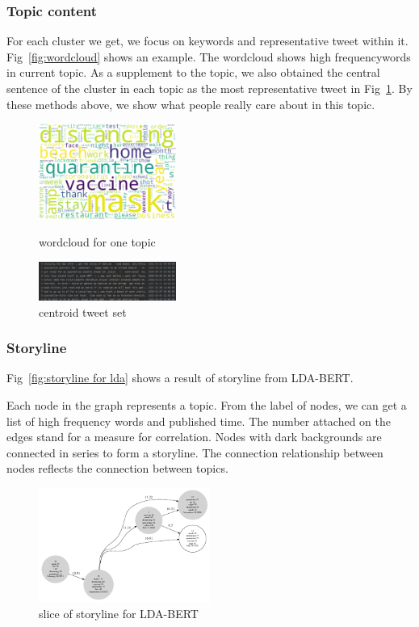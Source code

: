 \subsubsection{Topic content}
For each cluster we get, we focus on keywords and representative tweet within it. Fig~\ref{fig:wordcloud} shows an example. The wordcloud shows high frequencywords in current topic. As a supplement to the topic, we also obtained the central sentence of the cluster in each topic as the most representative tweet in Fig~\ref{fig:center_sentence}. By these methods above, we show what people really care about in this topic.
\begin{figure}
\centering
{
\includegraphics[width=0.4\textwidth]{imgs/lda_bert/Topic0_wordcloud.png}
\caption{wordcloud for one topic}
\label{fig:wordcloud}
}
\hspace{10pt}   
{
\includegraphics[width=0.4\textwidth]{imgs/lda_bert/center_sentence.png}
\caption{centroid tweet set}
\label{fig:center_sentence}
}
\hspace{10pt}
\end{figure}


\subsubsection{Storyline}
Fig~\ref{fig:storyline for lda} shows a result of storyline from LDA-BERT.  

Each node in the graph represents a topic. From the label of nodes, we can get a list of high frequency words and published time. The number attached on the edges stand for a measure for correlation. Nodes with dark backgrounds are connected in series to form a storyline. The connection relationship between nodes reflects the connection between topics.

\begin{figure}[h]
\centering
\includegraphics[width=0.5\textwidth]{imgs/lda_bert/storyline_lda_bert.gv.pdf}
\caption{slice of storyline for LDA-BERT}
\label{fig:storyline for lda_bert}
\end{figure}


